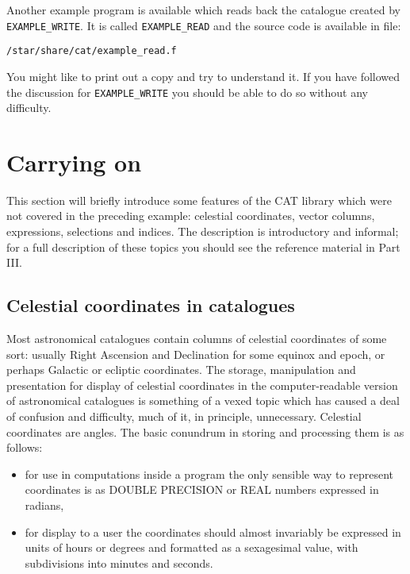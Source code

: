 Another example program is available which reads back the catalogue
created by {\tt EXAMPLE\_WRITE}. It is called {\tt EXAMPLE\_READ} 
and the source code is available in file:

\begin{center}
{\tt /star/share/cat/example\_read.f}
\end{center}

You might like to print out a copy and try to understand it. If you
have followed the discussion for {\tt EXAMPLE\_WRITE} you should be
able to do so without any difficulty.


\section{Carrying on}

This section will briefly introduce some features of the CAT library
which were not covered in the preceding example: celestial coordinates,
vector columns, expressions, selections and indices. The description is 
introductory and informal; for a full description of these topics you 
should see the reference material in Part III.


\subsection{Celestial coordinates in catalogues}

Most astronomical catalogues contain columns of celestial 
coordinates of some sort: usually Right Ascension and 
Declination for some equinox and epoch, or perhaps Galactic or 
ecliptic coordinates. The storage, manipulation and presentation 
for display of celestial coordinates in the computer-readable 
version of astronomical catalogues is something of a vexed topic 
which has caused a deal of confusion and difficulty, much of it, 
in principle, unnecessary. Celestial coordinates are angles. The 
basic conundrum in storing and processing them is as follows:

\begin{itemize}

  \item for use in computations inside a program the only 
  sensible way to represent coordinates is as DOUBLE PRECISION or 
  REAL numbers expressed in radians,

  \item for display to a user the coordinates should almost 
   invariably be expressed in units of hours or degrees and 
   formatted as a sexagesimal value, with subdivisions into minutes 
   and seconds.

\end{itemize}

